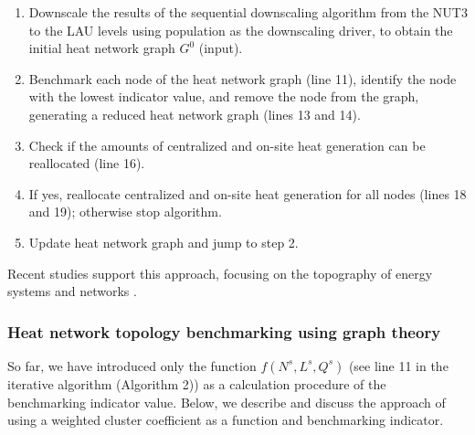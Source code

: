 \begin{enumerate}[nolistsep]
	\item Downscale the results of the sequential downscaling algorithm from the NUT3 to the LAU levels using population as the downscaling driver, to obtain the initial heat network graph $G^{0}$ (input).
	\item Benchmark each node of the heat network graph (line 11), identify the node with the lowest indicator value, and remove the node from the graph, generating a reduced heat network graph (lines 13 and 14).
	\item Check if the amounts of centralized and on-site heat generation can be reallocated (line 16).
	\item If yes, reallocate centralized and on-site heat generation for all nodes (lines 18 and 19); otherwise stop algorithm.
	\item Update heat network graph and jump to step 2.
\end{enumerate}
\vspace{0.5cm}

Recent studies support this approach, focusing on the topography of energy systems and networks . 

\subsubsection{Heat network topology benchmarking using graph theory}\label{bench}
So far, we have introduced only the function $f(N^{s}, L^{s}, Q^{s})$ (see line 11 in the iterative algorithm (Algorithm 2)) as a calculation procedure of the benchmarking indicator value. Below, we describe and discuss the approach of using a weighted cluster coefficient as a function and benchmarking indicator.\vspace{0.3cm}

